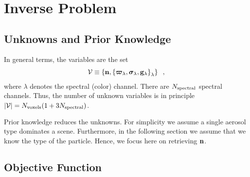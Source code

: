 \documentclass[10pt,letterpaper]{article}
\newcommand{\vect}[1]{\bm{#1}}
\begin{document}




\section{Inverse Problem}
\label{sec:inverse-problem}


\subsection{Unknowns and Prior Knowledge}
\label{sec:prior}

In general terms, the variables are the set
\begin{equation}
  {\cal V}\equiv
  \left\{
    {\bf n},
    \left\{
      \vect{\varpi}_{\lambda},\vect{\sigma}_{\lambda},{\bf g}_{\lambda}
    \right\}_{\lambda}
  \right\}
  \;\;,
  \label{eq:calV}
\end{equation}
where $\lambda$ denotes the spectral (color) channel.  There are
$N_{\rm spectral}$ spectral channels.  Thus, the number of unknown
variables is in principle \mbox{$|{\cal V}|=N_{\rm voxels}(1+3N_{\rm
    spectral})$}.

Prior knowledge reduces the unknowns. For simplicity we assume a
single aerosol type dominates a scene. Furthermore, in the following
section we assume that we know the type of the particle. Hence, we
focus here on retrieving ${\bf n}$.


\subsection{Objective Function}
\label{sec:objective-function}
\end{document}
